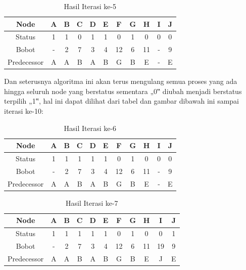 \begin{enumerate}
\begin{table}[htbp]
\begin{center}
\begin{tabular}{|c|c|c|c|c|c|c|c|c|c|c|}
\hline
Node & A & B & C & D & E & F & G & H & I & J \\
\hline
Status & 1 & 1 & 0 & 1 & 1 & 0 & 1 & 0 & 0 & 0\\
\hline
Bobot & - & 2 & 7 & 3 & 4 & 12 & 6 & 11 & - & 9 \\
\hline
Predecessor & A & A & B & A & B & G & B & E & -  & E \\
\hline
\end{tabular}
\caption{Hasil Iterasi ke-5}
\end{center}
\end{table}

Dan seterusnya algoritma ini akan terus mengulang semua proses yang ada hingga seluruh node yang berstatus sementara „0‟ diubah menjadi berstatus terpilih „1‟, hal ini dapat dilihat dari tabel dan gambar dibawah ini sampai iterasi ke-10:

\begin{table}[htbp]
\begin{center}
\begin{tabular}{|c|c|c|c|c|c|c|c|c|c|c|}
\hline
Node & A & B & C & D & E & F & G & H & I & J \\
\hline
Status & 1 & 1 & 1 & 1 & 1 & 0 & 1 & 0 & 0 & 0\\
\hline
Bobot & - & 2 & 7 & 3 & 4 & 12 & 6 & 11 & - & 9 \\
\hline
Predecessor & A & A & B & A & B & G & B & E & -  & E \\
\hline
\end{tabular}
\caption{Hasil Iterasi ke-6}
\end{center}
\end{table}

\begin{table}[htbp]
\begin{center}
\begin{tabular}{|c|c|c|c|c|c|c|c|c|c|c|}
\hline
Node & A & B & C & D & E & F & G & H & I & J \\
\hline
Status & 1 & 1 & 1 & 1 & 1 & 0 & 1 & 0 & 0 & 1\\
\hline
Bobot & - & 2 & 7 & 3 & 4 & 12 & 6 & 11 & 19 & 9 \\
\hline
Predecessor & A & A & B & A & B & G & B & E & J  & E \\
\hline
\end{tabular}
\caption{Hasil Iterasi ke-7}
\end{center}
\end{table}



\end{enumerate}
